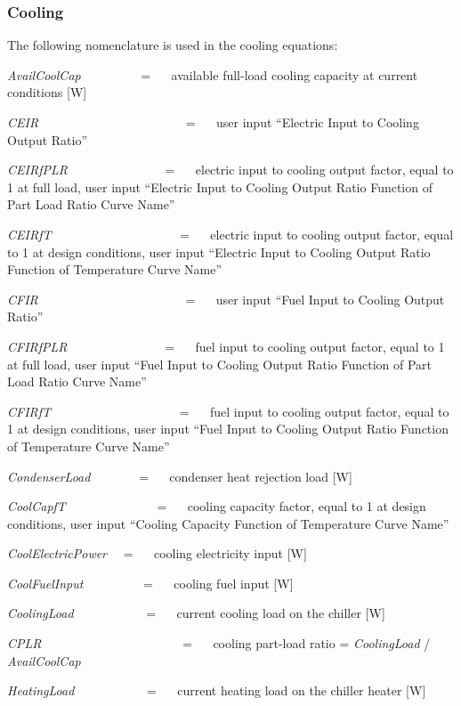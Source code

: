 \subsubsection{Cooling}\label{cooling}

The following nomenclature is used in the cooling equations:

\emph{AvailCoolCap}~~~~~~~~~ = ~~ available full-load cooling capacity at current conditions {[}W{]}

\emph{CEIR}~~~~~~~~~~~~~~~~~~~~~~~ = ~~ user input ``Electric Input to Cooling Output Ratio''

\emph{CEIRfPLR}~~~~~~~~~~~~~~~ = ~~ electric input to cooling output factor, equal to 1 at full load, user input ``Electric Input to Cooling Output Ratio Function of Part Load Ratio Curve Name''

\emph{CEIRfT}~~~~~~~~~~~~~~~~~~~~ = ~~ electric input to cooling output factor, equal to 1 at design conditions, user input ``Electric Input to Cooling Output Ratio Function of Temperature Curve Name''

\emph{CFIR}~~~~~~~~~~~~~~~~~~~~~~~ = ~~ user input ``Fuel Input to Cooling Output Ratio''

\emph{CFIRfPLR}~~~~~~~~~~~~~~~ = ~~ fuel input to cooling output factor, equal to 1 at full load, user input ``Fuel Input to Cooling Output Ratio Function of Part Load Ratio Curve Name''

\emph{CFIRfT}~~~~~~~~~~~~~~~~~~~~ = ~~ fuel input to cooling output factor, equal to 1 at design conditions, user input ``Fuel Input to Cooling Output Ratio Function of Temperature Curve Name''

\emph{CondenserLoad~~~~~~~} = ~~ condenser heat rejection load {[}W{]}

\emph{CoolCapfT}~~~~~~~~~~~~~~ = ~~ cooling capacity factor, equal to 1 at design conditions, user input ``Cooling Capacity Function of Temperature Curve Name''

\emph{CoolElectricPower}~~ = ~~ cooling electricity input {[}W{]}

\emph{CoolFuelInput}~~~~~~~~~ = ~~ cooling fuel input {[}W{]}

\emph{CoolingLoad}~~~~~~~~~~~ = ~~ current cooling load on the chiller {[}W{]}

\emph{CPLR}~~~~~~~~~~~~~~~~~~~~~~ = ~~ cooling part-load ratio = \emph{CoolingLoad} / \emph{AvailCoolCap}

\emph{HeatingLoad}~~~~~~~~~~~ = ~~ current heating load on the chiller heater {[}W{]}

